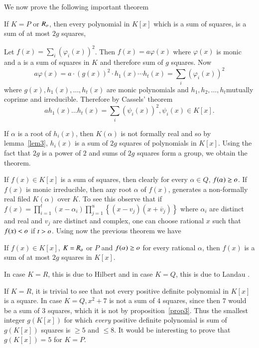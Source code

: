 We now prove the following important theorem

\begin{thm}\label{thm10}
If $K=P$ or $R_{o}$, then every polynomial in $K[x]$ which is a sum
of squares, is a sum of at most $2g$ squares,
\end{thm}

\begin{Proof}
Let $f(x)=\sum\limits_{i}(\varphi_i(x))^{2}$. Then $f(x)=a\varphi(x)$
where $\varphi(x)$ is monic and a is a sum of squares in $K$ and
therefore sum of $g$ squares. Now 
$$
a\varphi(x)=a\cdot(g(x))^{2}\cdot h_1(x)\cdots h_t(x)=\sum\limits_{i}(\varphi_i(x))^{2}
$$
where $g(x), h_1(x),\ldots,h_t(x)$ are monic polynomials and
$h_1,h_2,\ldots,h_t$\break mutually coprime and irreducible. Therefore by
Cassels' theorem 
$$
ah_1(x)\ldots h_t(x)=\sum\limits_{i}(\psi_i(x))^{2},\psi_i(x)\in K[x].
$$

If $\alpha$ is a root of $h_i(x)$, then $K(\alpha)$ is not formally
real and so by lemma~\ref{lem3}, $h_i(x)$ is a sum of $2g$ squares of
polynomials in $K[x]$. Using the fact that $2g$ is a power of $2$ and
sums of $2g$ squares form a group, we obtain the theorem.

If $f(x)\in K[x]$ is a sum of squares, then clearly for every $\alpha
\in Q$, $f(\alpha)\geq o$. If $f(x)$ is monic irreducible, then any
root $\alpha$ of $f(x)$, generates a non-formally real filed
$K(\alpha)$ over $K$. To see this observe that if
$f(x)=\prod\limits_{i=1}^{t}(x-\alpha_i)\prod\limits_{j=1}^{u}\left\{(x-v_j)(x+\overline{v}_{j})\right\}$
where $\alpha_i$ are distinct and real and $v_j$ are distinct and
complex, one can choose rational $x$ such that $f(x)<o$ if
$t>o$. Using now the previous theorem we have
\enprf
\end{Proof}

\begin{thm}\label{thm11}
If $f(x)\in K[x]$, $K=R_{o}$ or $P$ and $f(\alpha)\geq o$ for
every rational $\alpha$, then $f(x)$ is a sum of at most $2g$ squares
in $K[x]$.
\end{thm}

In case $K=R$, this is due to Hilbert \cite{key8} and in case $K=Q$,
this is due to Landau \cite{key10}.


If $K=R$, it is trivial to see that not every positive definite
polynomial in $K[x]$ is a square. In case $K=Q, x^{2}+7$ is not a sum
of $4$ squares, since then $7$ would be a sum of $3$ squares, which it
is not by proposition~\ref{prop3}. Thus the smallest integer $g(K[x])$
for which \textit{every} positive definite polynomial is sum of
$g(K[x])$ squares is $\geq 5$ and $\leq 8$. It would be interesting to
prove that $g(K[x])=5$ for $K=P$. 

